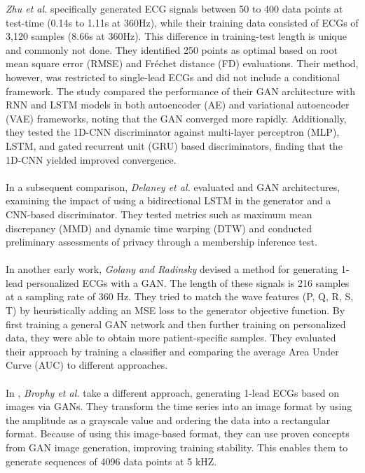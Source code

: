 \textit{Zhu et al.} specifically generated ECG signals between 50 to 400 data points at test-time (0.14s to 1.11s at 360Hz), while their training data consisted of ECGs of 3,120 samples (8.66s at 360Hz). This difference in training-test length is unique and commonly not done. They identified 250 points as optimal based on root mean square error (RMSE) and Fréchet distance (FD) evaluations. Their method, however, was restricted to single-lead ECGs and did not include a conditional framework. The study compared the performance of their GAN architecture with RNN and LSTM models in both autoencoder (AE) and variational autoencoder (VAE) frameworks, noting that the GAN converged more rapidly. Additionally, they tested the 1D-CNN discriminator against multi-layer perceptron (MLP), LSTM, and gated recurrent unit (GRU) based discriminators, finding that the 1D-CNN yielded improved convergence.
\\ \\
In a subsequent comparison, \textit{Delaney et al.} \cite{delaney_synthesis_2019} evaluated \cite{esteban_real-valued_2017} and \cite{zhu_electrocardiogram_2019} GAN architectures, examining the impact of using a bidirectional LSTM in the generator and a CNN-based discriminator. They tested metrics such as maximum mean discrepancy (MMD) and dynamic time warping (DTW) and conducted preliminary assessments of privacy through a membership inference test.
\\ \\
In another early work, \textit{Golany and Radinsky} \cite{golany_pgans_2019} devised a method for generating 1-lead personalized ECGs with a GAN. The length of these signals is 216 samples at a sampling rate of 360 Hz. They tried to match the wave features (P, Q, R, S, T) by heuristically adding an MSE loss to the generator objective function. By first training a general GAN network and then further training on personalized data, they were able to obtain more patient-specific samples. They evaluated their approach by training a classifier and comparing the average Area Under Curve (AUC) to different approaches. 
\\ \\ 
In \cite{brophy_quick_2019}, \textit{Brophy et al.} take a different approach, generating 1-lead ECGs based on images via GANs. They transform the time series into an image format by using the amplitude as a grayscale value and ordering the data into a rectangular format. Because of using this image-based format, they can use proven concepts from GAN image generation, improving training stability. This enables them to generate sequences of 4096 data points at 5 kHZ.
